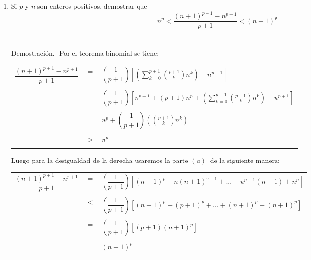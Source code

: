 \begin{enumerate}
\begin{enumerate}[\bfseries (a)]
\item Si $p$ y $n$ son enteros positivos, demostrar que $$n^p < \dfrac{(n+1)^{p+1} - n^{p+1}}{p+1} < (n+1)^p$$\\\\
Demostración.- \; Por el teorema binomial se tiene:
\begin{center}
\begin{tabular}{rcl}
$\dfrac{(n+1)^{p+1} - n^{p+1}}{p+1}$&$=$&$\left( \dfrac{1}{p+1} \right) \left[ \left( \sum\limits_{k=0}^{p+1} {p+1 \choose k} n^k \right) - n^{p+1} \right]$\\\\
&$=$&$\left( \dfrac{1}{p+1} \right) \left[ n^{p+1} + (p+1)n^p + \left( \sum\limits_{k=0}^{p-1} {p+1 \choose k} n^k \right) - n^{p+1} \right]$\\\\
&$=$&$n^p + \left( \dfrac{1}{p+1} \right) \left( {p+1 \choose k} n^k \right)$\\\\
&$>$&$n^p$\\\\
\end{tabular}
\end{center}
Luego para la desigualdad de la derecha usaremos la parte $(a)$, de la siguiente manera:
\begin{center}
\begin{tabular}{rcl}
$\dfrac{(n+1)^{p+1} - n^{p+1}}{p+1}$&$=$&$\left( \dfrac{1}{p+1} \right)\left[ (n+1)^p + n(n+1)^{p-1} + ... + n^{p-1}(n+1) + n^p \right]$\\\\
&$<$&$\left( \dfrac{1}{p+1} \right)\left[ (n+1)^p + (p+1)^p + ... + (n+1)^p + (n+1)^p \right]$\\\\
&$=$&$\left( \dfrac{1}{p+1} \right) \left[ (p+1)(n+1)^p \right]$\\\\
&$=$&$(n+1)^p$\\\\
\end{tabular}
\end{center}


\end{enumerate}
\end{enumerate}
